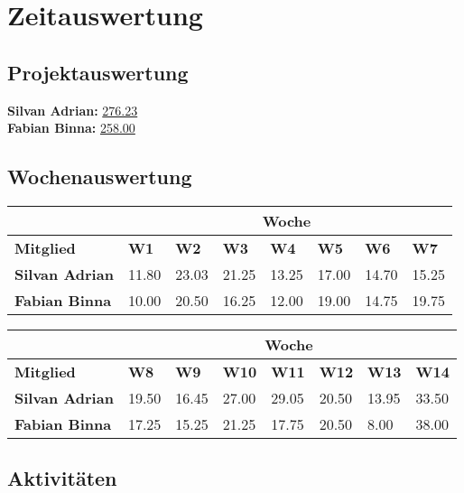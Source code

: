 \chapter{Zeitauswertung}

\section{Projektauswertung}

\textbf{Silvan Adrian:} \underline{276.23}
\\
\textbf{Fabian Binna:} \underline{258.00}

\section{Wochenauswertung}

\begin{table}[h]
\begin{tabularx}{\linewidth}{l X X X X X X X}
& \multicolumn{7}{c}{\textbf{Woche}}\\
\hline
\textbf{Mitglied} & \textbf{W1} & \textbf{W2} & \textbf{W3} & \textbf{W4} & \textbf{W5} & \textbf{W6} & \textbf{W7} \\
\hline
\textbf{Silvan Adrian} & 11.80  & 23.03  & 21.25 & 13.25 & 17.00 & 14.70 & 15.25  \\
\hline
\textbf{Fabian Binna} & 10.00 & 20.50 & 16.25 & 12.00 & 19.00 & 14.75 & 19.75 \\
\end{tabularx}
\end{table}
\begin{table}[h]
\begin{tabularx}{\linewidth}{l X X X X X X X}
 & \multicolumn{7}{c}{\textbf{Woche}}\\
\hline
\textbf{Mitglied} & \textbf{W8} & \textbf{W9} & \textbf{W10} & \textbf{W11} & \textbf{W12} &
 \textbf{W13} & \textbf{W14}\\
\hline
\textbf{Silvan Adrian} & 19.50 & 16.45 & 27.00 & 29.05  & 20.50  & 13.95 & 33.50 \\
\hline
\textbf{Fabian Binna} & 17.25 & 15.25 & 21.25 & 17.75 & 20.50 & 8.00 & 38.00 \\
\end{tabularx}
\end{table}

\section{Aktivitäten}

